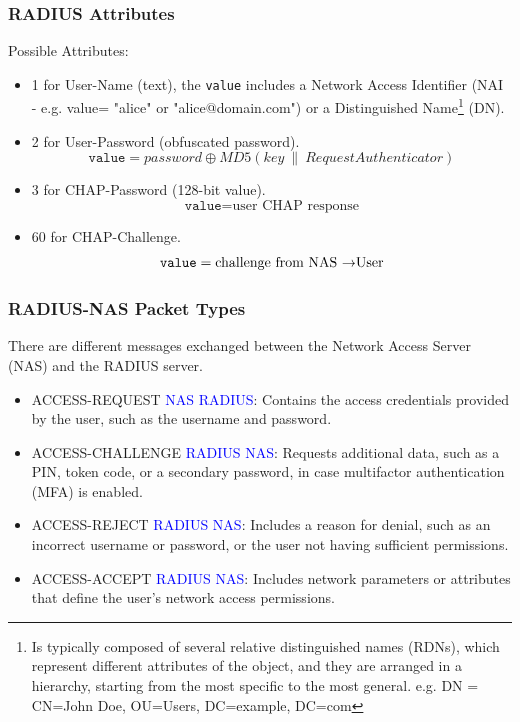 \subsubsection{RADIUS Attributes}
Possible Attributes:
\begin{itemize}
    \item 1 for User-Name (text), the \texttt{value} includes a Network Access Identifier (NAI - e.g. value= "alice" or "alice@domain.com") or a Distinguished Name\footnote{Is typically composed of several relative distinguished names (RDNs), which represent different attributes of the object, and they are arranged in a hierarchy, starting from the most specific to the most general. e.g. DN = CN=John Doe, OU=Users, DC=example, DC=com} (DN).
    \item 2 for User-Password (obfuscated password).
    \begin{equation*}
        \texttt{value} =password \oplus MD5(key\ \| \ RequestAuthenticator)
    \end{equation*}
    \item 3 for CHAP-Password (128-bit value).
    \begin{equation*}
        \texttt{value}=\text{user CHAP response}
    \end{equation*}
    \item 60 for CHAP-Challenge.
    \begin{equation*}
        \texttt{value}=\text{challenge from NAS \textrightarrow User}
    \end{equation*}
\end{itemize}


\subsubsection{RADIUS-NAS Packet Types}
There are different messages exchanged between the Network Access Server (NAS) and the RADIUS server.

\begin{itemize}
    \item ACCESS-REQUEST \textcolor{blue}{NAS \textrightarrow RADIUS}: Contains the access credentials provided by the user, such as the username and password.
    \item ACCESS-CHALLENGE \textcolor{Blue}{RADIUS \textrightarrow NAS}: Requests additional data, such as a PIN, token code, or a secondary password, in case multifactor authentication (MFA) is enabled.
    \item ACCESS-REJECT \textcolor{Blue}{RADIUS \textrightarrow NAS}: Includes a reason for denial, such as an incorrect username or password, or the user not having sufficient permissions.
    \item ACCESS-ACCEPT \textcolor{Blue}{RADIUS \textrightarrow NAS}: Includes network parameters or attributes that define the user's network access permissions.
\end{itemize}
\clearpage

